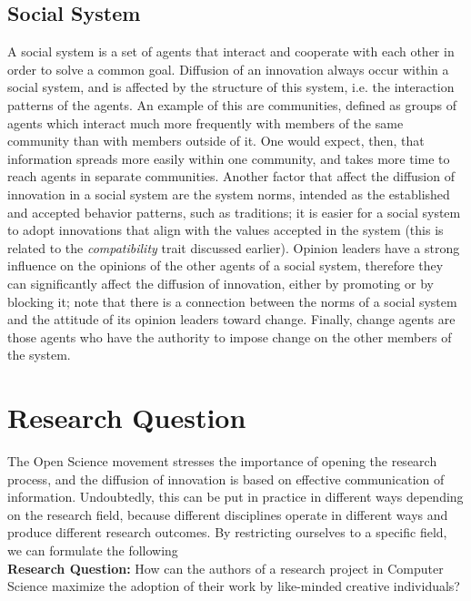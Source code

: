 \documentclass[12pt]{article}
\begin{document}
\subsection{Social System}
\label{sec:orgd654838}
A social system is a set of agents that interact and cooperate with each other in order to solve a common goal. Diffusion of an innovation always occur within a social system, and is affected by the structure of this system, i.e. the interaction patterns of the agents. An example of this are communities, defined as groups of agents which interact much more frequently with members of the same community than with members outside of it. One would expect, then, that information spreads more easily within one community, and takes more time to reach agents in separate communities. Another factor that affect the diffusion of innovation in a social system are the system norms, intended as the established and accepted behavior patterns, such as traditions; it is easier for a social system to adopt innovations that align with the values accepted in the system (this is related to the \emph{compatibility} trait discussed earlier). Opinion leaders have a strong influence on the opinions of the other agents of a social system, therefore they can significantly affect the diffusion of innovation, either by promoting or by blocking it; note that there is a connection between the norms of a social system and the attitude of its opinion leaders toward change. Finally, change agents are those agents who have the authority to impose change on the other members of the system.

\section{Research Question}
\label{sec:org166e6aa}
The Open Science movement stresses the importance of opening the research process, and the diffusion of innovation is based on effective communication of information. Undoubtedly, this can be put in practice in different ways depending on the research field, because different disciplines operate in different ways and produce different research outcomes. By restricting ourselves to a specific field, we can formulate the following \\

\textbf{Research Question:} How can the authors of a research project in Computer Science maximize the adoption of their work by like-minded creative individuals? \\
\end{document}
